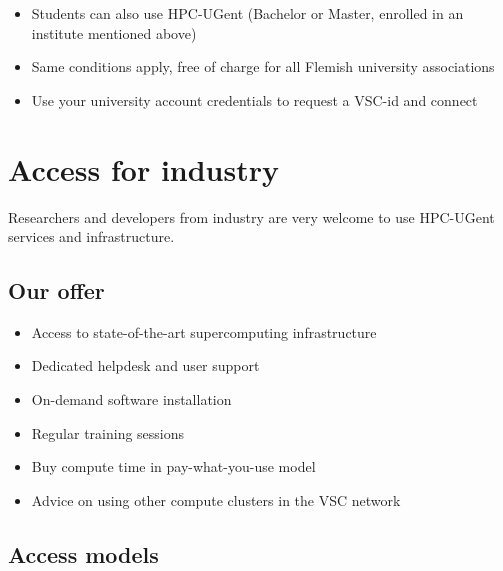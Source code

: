 \begin{itemize}
  \item Students can also use HPC-UGent (Bachelor or Master, enrolled in an institute mentioned above)
  \item Same conditions apply, free of charge for all Flemish university associations
  \item Use your university account credentials to request a VSC-id and connect
\end{itemize}



\section{Access for industry}

Researchers and developers from industry are very welcome to use HPC-UGent services and infrastructure.


\subsection{Our offer}

\begin{itemize}
  \item Access to state-of-the-art supercomputing infrastructure
  \item Dedicated helpdesk and user support
  \item On-demand software installation
  \item Regular training sessions
  \item Buy compute time in pay-what-you-use model
  \item Advice on using other compute clusters in the VSC network
\end{itemize}


\subsection{Access models}

